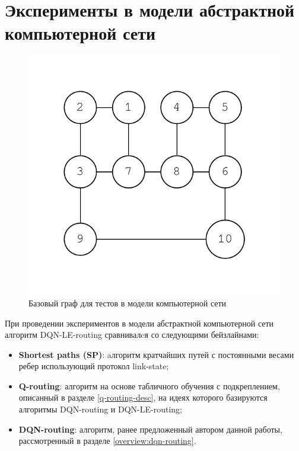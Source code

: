 \documentclass[specification,annotation,times]{itmo-student-thesis}
\theoremstyle{definition}
\begin{document}
\section{Эксперименты в модели абстрактной компьютерной сети}\label{experiments:network}

\begin{figure}[!h]
  \caption{Базовый граф для тестов в модели компьютерной сети}\label{fig-simple-network}
  \centering
  \includegraphics[scale=0.6]{graph-2.pdf}
\end{figure}

При проведении экспериментов в модели абстрактной компьютерной сети алгоритм
DQN-LE-routing сравнивалcя со следующими бейзлайнами:

\begin{itemize}
  \item \textbf{Shortest paths (SP)}: aлгоритм кратчайших путей с постоянными
    весами ребер использующий протокол link-state;
  \item \textbf{Q-routing}: алгоритм на основе табличного обучения с
    подкреплением, описанный в разделе \ref{q-routing-desc}, на идеях которого
    базируются алгоритмы DQN-routing и DQN-LE-routing;
  \item \textbf{DQN-routing}: алгоритм, ранее предложенный автором данной
    работы, рассмотренный в разделе \ref{overview:dqn-routing}.
\end{itemize}
\end{document}
